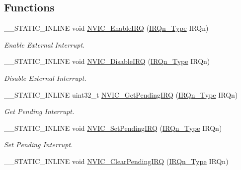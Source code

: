 \subsection*{Functions}
\begin{DoxyCompactItemize}
\item 
\+\_\+\+\_\+\+S\+T\+A\+T\+I\+C\+\_\+\+I\+N\+L\+I\+NE void \hyperlink{group___c_m_s_i_s___core___n_v_i_c_functions_ga3349f2e3580d7ce22d6530b7294e5921}{N\+V\+I\+C\+\_\+\+Enable\+I\+RQ} (\hyperlink{group___peripheral__interrupt__number__definition_ga7e1129cd8a196f4284d41db3e82ad5c8}{I\+R\+Qn\+\_\+\+Type} I\+R\+Qn)
\begin{DoxyCompactList}\small\item\em Enable External Interrupt. \end{DoxyCompactList}\item 
\+\_\+\+\_\+\+S\+T\+A\+T\+I\+C\+\_\+\+I\+N\+L\+I\+NE void \hyperlink{group___c_m_s_i_s___core___n_v_i_c_functions_ga260fba04ac8346855c57f091d4ee1e71}{N\+V\+I\+C\+\_\+\+Disable\+I\+RQ} (\hyperlink{group___peripheral__interrupt__number__definition_ga7e1129cd8a196f4284d41db3e82ad5c8}{I\+R\+Qn\+\_\+\+Type} I\+R\+Qn)
\begin{DoxyCompactList}\small\item\em Disable External Interrupt. \end{DoxyCompactList}\item 
\+\_\+\+\_\+\+S\+T\+A\+T\+I\+C\+\_\+\+I\+N\+L\+I\+NE uint32\+\_\+t \hyperlink{group___c_m_s_i_s___core___n_v_i_c_functions_gafec8042db64c0f8ed432b6c8386a05d8}{N\+V\+I\+C\+\_\+\+Get\+Pending\+I\+RQ} (\hyperlink{group___peripheral__interrupt__number__definition_ga7e1129cd8a196f4284d41db3e82ad5c8}{I\+R\+Qn\+\_\+\+Type} I\+R\+Qn)
\begin{DoxyCompactList}\small\item\em Get Pending Interrupt. \end{DoxyCompactList}\item 
\+\_\+\+\_\+\+S\+T\+A\+T\+I\+C\+\_\+\+I\+N\+L\+I\+NE void \hyperlink{group___c_m_s_i_s___core___n_v_i_c_functions_ga3ecf446519da33e1690deffbf5be505f}{N\+V\+I\+C\+\_\+\+Set\+Pending\+I\+RQ} (\hyperlink{group___peripheral__interrupt__number__definition_ga7e1129cd8a196f4284d41db3e82ad5c8}{I\+R\+Qn\+\_\+\+Type} I\+R\+Qn)
\begin{DoxyCompactList}\small\item\em Set Pending Interrupt. \end{DoxyCompactList}\item 
\+\_\+\+\_\+\+S\+T\+A\+T\+I\+C\+\_\+\+I\+N\+L\+I\+NE void \hyperlink{group___c_m_s_i_s___core___n_v_i_c_functions_ga332e10ef9605dc6eb10b9e14511930f8}{N\+V\+I\+C\+\_\+\+Clear\+Pending\+I\+RQ} (\hyperlink{group___peripheral__interrupt__number__definition_ga7e1129cd8a196f4284d41db3e82ad5c8}{I\+R\+Qn\+\_\+\+Type} I\+R\+Qn)

\end{DoxyCompactItemize}
